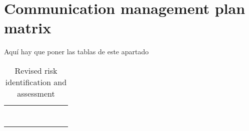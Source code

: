 \section{Communication management plan matrix}
\begin{landscape}
	
Aquí hay que poner las tablas de este apartado

\begin{table}[H]
	\centering
	\begin{tabular}{| >{\raggedright\arraybackslash}p{2.4cm}  | >{\raggedright\arraybackslash}p{2.4cm} | >{\raggedright\arraybackslash}p{2.4cm} | >{\raggedright\arraybackslash}p{2.4cm} | >{\raggedright\arraybackslash}p{2.4cm} | >{\raggedright\arraybackslash}p{2.4cm} | >{\raggedright\arraybackslash}p{2.4cm} | >{\raggedright\arraybackslash}p{2.4cm} |  }
		

\toprule [2pt]
		 &   &    &     &     &   &  & \\  
\midrule [1.5pt]
	
		&   &    &   &     &   &  &  \\  
		
		\hline
		
		&   &    &   &     &   &   &\\  
		
		\hline
		
		&   &    &   &     &   &   &\\  
		
		\hline
		
		&   &    &   &     &   &   &\\  
		
		\hline
		
		&   &    &   &     &   &   &\\  
		
		\hline
		
		&   &    &   &     &   &   &\\  
		
		\hline
		
		&   &    &   &     &   &   &\\  
		
		\bottomrule[2pt]
		
	\end{tabular}
	\caption{Revised risk identification and assessment}
\end{table}

\vspace*{\fill}


\end{landscape}